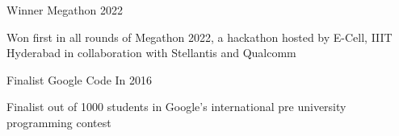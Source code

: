 
\begin{cventries}

  \cventry
    {Winner} %
    {Megathon} %
    {} %
    {2022} %
    {
      \begin{cvitems} %
		\item{Won first in all rounds of Megathon 2022, a hackathon hosted by E-Cell, IIIT Hyderabad in collaboration with Stellantis and Qualcomm}
      \end{cvitems}
    }
    
	\cventry
    {Finalist} %
    {Google Code In} %
    {} %
    {2016} %
    {
      \begin{cvitems} %
		\item{Finalist out of 1000 students in Google's international pre university programming contest}
      \end{cvitems}
    }
\end{cventries}
